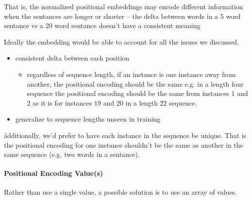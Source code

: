 \r{That is, the normalized positional embeddings may encode different information when the sentances are longer or shorter -- the delta between words in a 5 word sentance vs a 20 word sentance doesn't have a consistent meaning}


\r{Ideally the embedding would be able to account for all the issues we discussed.}

\begin{itemize}[noitemsep,topsep=0pt]
	\item consistent delta between each position
		\begin{itemize}[noitemsep,topsep=0pt]
			\item regardless of sequence length, if an instance is one instance away from another, the positional encoding should be the same e.g. in a length four sequence the positional encoding should be the same from instances $1$ and $2$ as it is for instances $19$ and $20$ in a length $22$ sequence.
		\end{itemize}
	\item generalize to sequence lengths unseen in training
\end{itemize}

\r{additionally, we'd prefer to have each instance in the sequence be unique. That is the positional encoding for one instance shouldn't be the same as another in the same sequence (e.g. two words in a sentance).}

\paragraph{Positional Encoding Value(s)}

\r{Rather than use a single value, a possible solution is to use an array of values.}





\TD{}




